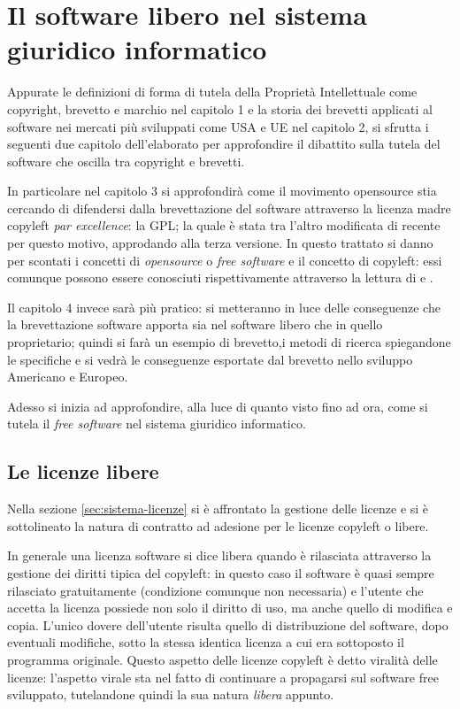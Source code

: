  \chapter{Il software libero nel sistema giuridico informatico}

Appurate le definizioni di forma di tutela della Proprietà Intellettuale come copyright, brevetto e marchio nel capitolo 1 e la storia dei brevetti applicati al software nei mercati più sviluppati come USA e UE nel capitolo 2, si sfrutta i seguenti due capitolo dell'elaborato per approfondire il dibattito sulla tutela del software che oscilla tra copyright e brevetti.

In particolare nel capitolo 3 si approfondirà come il movimento opensource stia cercando di difendersi dalla brevettazione del software attraverso la licenza madre copyleft \textit{par excellence}: la GPL; la quale è stata tra l'altro modificata di recente per questo motivo, approdando alla terza versione.
In questo trattato si danno per scontati i concetti di \textit{opensource} o \textit{free software} e il concetto di copyleft: essi comunque possono essere conosciuti rispettivamente attraverso la lettura di \cite[Compendio di libertà informatica e cultura open]{Aliprandi-compendio} e \cite[Copyleft e Opencontent]{Aliprandi-copyleft}.

Il capitolo 4 invece sarà più pratico: si metteranno in luce delle conseguenze che la brevettazione software apporta sia nel software libero che in quello proprietario; quindi si farà un esempio di brevetto,i metodi di ricerca spiegandone le specifiche e si vedrà le conseguenze esportate dal brevetto nello sviluppo Americano e Europeo.

Adesso si inizia ad approfondire, alla luce di quanto visto fino ad ora, come si tutela il \textit{free software} nel sistema giuridico informatico.


\section{Le licenze libere}

Nella sezione \ref{sec:sistema-licenze} si è affrontato la gestione delle licenze e si è sottolineato la natura di contratto ad adesione per le licenze copyleft o libere.

In generale una licenza software si dice libera quando è rilasciata attraverso la gestione dei diritti tipica del copyleft: in questo caso il software è quasi sempre rilasciato gratuitamente (condizione comunque non necessaria) e l'utente che accetta la licenza possiede non solo il diritto di uso, ma anche quello di modifica e copia. L'unico dovere dell'utente risulta quello di distribuzione del software, dopo eventuali modifiche, sotto la stessa identica licenza a cui era sottoposto il programma originale. Questo aspetto delle licenze copyleft è detto viralità delle licenze: l'aspetto virale sta nel fatto di continuare a propagarsi sul software free sviluppato, tutelandone quindi la sua natura \textit{libera} appunto.

